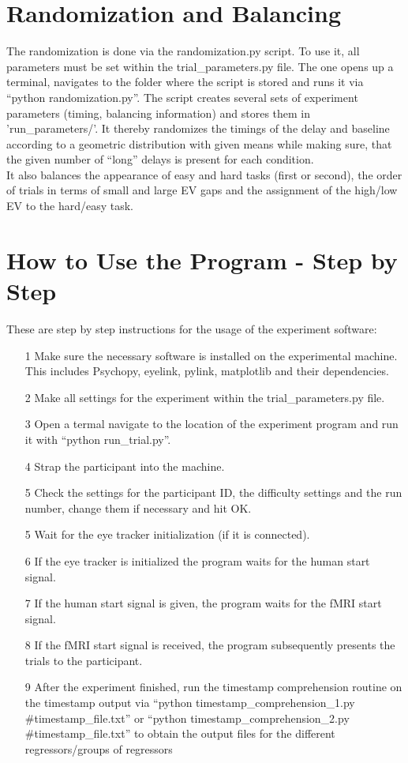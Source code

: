 \section{Randomization and Balancing}
The randomization is done via the randomization.py script. To use it, all parameters must be set within the trial\_parameters.py file. The one opens up a terminal, navigates to the folder where the script is stored and runs it via ``python randomization.py''.
The script creates several sets of experiment parameters (timing, balancing information) and stores them in 'run\_parameters/'. It thereby randomizes the timings of the delay and baseline according to a geometric distribution with given means while making sure, that the given number of ``long'' delays is present for each condition.\\
It also balances the appearance of easy and hard tasks (first or second), the order of trials in terms of small and large EV gaps and the assignment of the high/low EV to the hard/easy task.

\section{How to Use the Program - Step by Step}

These are step by step instructions for the usage of the experiment software:
\begin{itemize}
    \item[1] Make sure the necessary software is installed on the experimental machine. This includes Psychopy, eyelink, pylink, matplotlib and their dependencies.
    \item[2] Make all settings for the experiment within the trial\_parameters.py file.
    \item[3] Open a termal navigate to the location of the experiment program  and run it with ``python run\_trial.py''.
    \item[4] Strap the participant into the machine.
    \item[5] Check the settings for the participant ID, the difficulty settings and the run number, change them if necessary and hit OK.
    \item[5] Wait for the eye tracker initialization (if it is connected).
    \item[6] If the eye tracker is initialized the program waits for the human start signal.
    \item[7] If the human start signal is given, the program waits for the fMRI start signal.
    \item[8] If the fMRI start signal is received, the program subsequently presents the trials to the participant.
    \item[9] After the experiment finished, run the timestamp comprehension routine on the timestamp output via ``python timestamp\_comprehension\_1.py \#timestamp\_file.txt'' or ``python timestamp\_comprehension\_2.py \#timestamp\_file.txt'' to obtain the output files for the different regressors/groups of regressors
        
\end{itemize}

